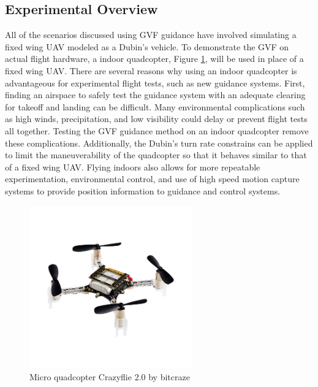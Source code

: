 \documentclass[numbered,pdftex]{ohio-etd}
\begin{document}
\subsection{Experimental Overview}
All of the scenarios discussed using GVF guidance have involved simulating a fixed wing UAV modeled as a Dubin's vehicle. To demonstrate the GVF on actual flight hardware, a indoor quadcopter, Figure \ref{fig:crazyflie2}, will be used in place of a fixed wing UAV. There are several reasons why using an indoor quadcopter is advantageous for experimental flight tests, such as new guidance systems. First, finding an airspace to safely test the guidance system with an adequate clearing for takeoff and landing can be difficult. Many environmental complications such as high winds, precipitation, and low visibility could delay or prevent flight tests all together. Testing the GVF guidance method on an indoor quadcopter remove these complications. Additionally, the Dubin's turn rate constrains can be applied to limit the maneuverability of the quadcopter so that it behaves similar to that of a fixed wing UAV. Flying indoors also allows for more repeatable experimentation, environmental control, and use of high speed motion capture systems to provide position information to guidance and control systems. 



\begin{figure}
	\centering
	\includegraphics[trim=0 25 0 30,clip,width=7cm]{PaperFigures/crazyflie}
	\caption{Micro quadcopter Crazyflie 2.0 by bitcraze}
	\label{fig:crazyflie2}
\end{figure}
\end{document}
